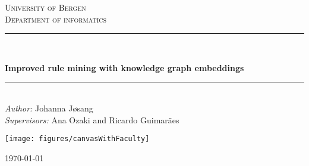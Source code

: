 \begin{titlepage}

\newcommand{\HRule}{\rule{\linewidth}{0.5mm}} %

\center %
 

\textsc{\LARGE University of Bergen \\ Department of informatics}\\[1.5cm] %


\HRule \\[0.5cm]
\begin{Huge}
	\bfseries{Improved rule mining with knowledge graph embeddings}\\[0.7cm] %
\end{Huge}
\HRule \\[0.5cm]


\large \emph{Author:} Johanna Jøsang\\
\large \emph{Supervisors:} Ana Ozaki and Ricardo Guimarães\\[2cm]


\centerline{\texttt{[image: figures/canvasWithFaculty]}}


{\large \monthyeardate\today}\\[3cm] %


\vfill %

\end{titlepage}
